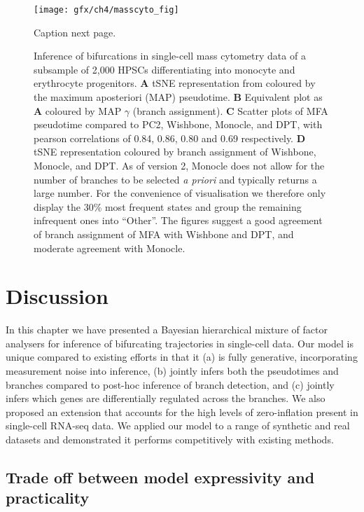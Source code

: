 \begin{figure}
	\centering
	\texttt{[image: gfx/ch4/masscyto\_fig]}
	\caption[]{Caption next page.} \label{fig:masscyto}
\end{figure}
\addtocounter{figure}{-1}
\begin{figure}
	\caption[Inference of bifurcations in single-cell mass cytometry data.]{Inference of bifurcations in single-cell mass cytometry data of a subsample of 2,000 HPSCs differentiating into monocyte and erythrocyte progenitors.
	\textbf{A} tSNE representation from \cite{setty2016wishbone} coloured by the maximum aposteriori (MAP) pseudotime.
	\textbf{B} Equivalent plot as \textbf{A} coloured by MAP $\gamma$ (branch assignment).
	\textbf{C} Scatter plots of MFA pseudotime compared to PC2, Wishbone, Monocle, and DPT, with pearson correlations of 0.84, 0.86, 0.80 and 0.69 respectively.
	\textbf{D} tSNE representation coloured by branch assignment of Wishbone, Monocle, and DPT. As of version 2, Monocle does not allow for the number of branches to be selected \emph{a priori} and typically returns a large number. For the convenience of visualisation we therefore only display the 30\% most frequent states and group the remaining infrequent ones into ``Other''. The figures suggest a good agreement of branch assignment of MFA with Wishbone and DPT, and moderate agreement with Monocle.
	}
\end{figure}



\section{Discussion}

In this chapter we have presented a Bayesian hierarchical mixture of factor analysers for inference of bifurcating trajectories in single-cell data. Our model is unique compared to existing efforts in that it (a) is fully generative, incorporating measurement noise into inference, (b) jointly infers both the pseudotimes and branches compared to post-hoc inference of branch detection, and (c) jointly infers which genes are differentially regulated across the branches. We also proposed an extension that accounts for the high levels of zero-inflation present in single-cell RNA-seq data. We applied our model to a range of synthetic and real datasets and demonstrated it  performs competitively with existing methods.

\subsection{Trade off between model expressivity and practicality}

